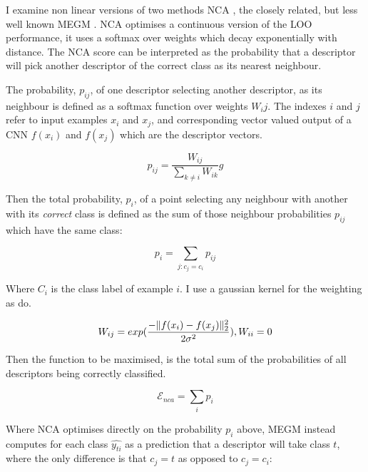 I examine non linear versions of two methods \gls{NCA} \cite{Goldberger2004}, the closely related, but less well known \gls{MEGM} \cite {Zaidi2011}. \gls{NCA} optimises a continuous version of the \gls{LOO} performance, it uses a softmax over weights which decay exponentially with distance. The \gls{NCA} score can be interpreted as the probability that a descriptor will pick another descriptor of the correct class as its nearest neighbour. 

The probability, $ p_{ij} $, of one descriptor selecting another descriptor, as its neighbour is defined as a softmax function over weights $W_ij$. The indexes $ i $ and $ j $ refer to input examples $x_i$ and $x_j$, and corresponding vector valued output of a \gls{CNN} $f(x_i)$ and $f(x_j)$ which are the descriptor vectors.

\begin{equation}
\label{eq:nca_prob_pair}
p_{ij} =  \frac {W_{ij}} {\sum_{k \neq i}{W_{ik}}}g
\end{equation}

Then the total probability, $ p_i $, of a point selecting any neighbour with another with its \emph{correct} class is defined as the sum of those neighbour probabilities $p_{ij}$ which have the same class:

\begin{equation}
\label{eq:nca_prob}
p_{i} =  \sum_{j:c_j = c_i}{p_{ij}}
\end{equation}

Where $ C_i $ is the class label of example $ i $. I use a gaussian kernel for the weighting as \cite{Zaidi2011} do. 

\begin{equation}
 \label{eq:gaussian_kernel}
W_{ij} = exp(\frac{-\lVert f(x_i) - f(x_j) \rVert^2_2 }{2\sigma^2}), \space W_{ii} = 0
\end{equation}


Then the function to be maximised, is the total sum of the probabilities of all descriptors being correctly classified.

\begin{equation}
\label{eq:nca_loss}
\mathcal{E}_{nca} =  \sum_i {p_i}
\end{equation}

Where \gls{NCA} optimises directly on the probability $ p_{i} $ above, \gls{MEGM} instead computes for each class $ \hat{y_{ti}} $ as a prediction that a descriptor will take class $ t $, where the only difference is that $ c_j = t $ as opposed to $ c_j = c_i $:

